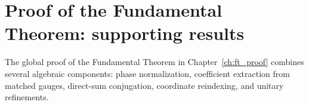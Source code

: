 \chapter{Proof of the Fundamental Theorem: supporting results}
\label{ch:ft_proof_supporting_results}

The global proof of the Fundamental Theorem in Chapter~\ref{ch:ft_proof}
combines several algebraic components: phase normalization, coefficient
extraction from matched gauges, direct-sum conjugation, coordinate reindexing,
and unitary refinements.



